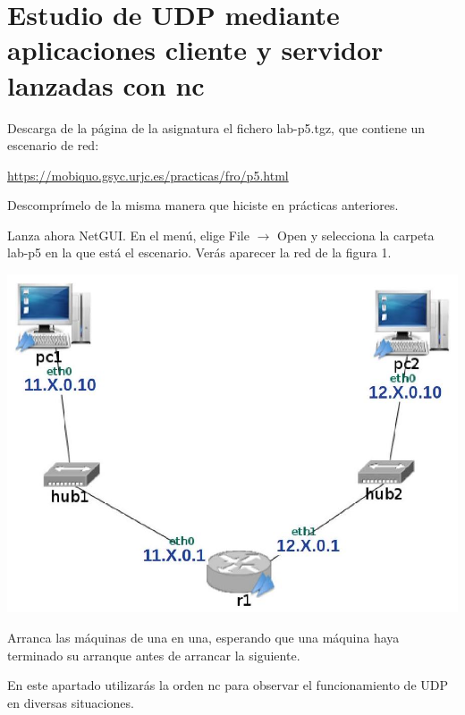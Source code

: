 \documentclass[12pt, a4paper]{report}
\begin{document}
\section{Estudio de UDP mediante aplicaciones cliente y servidor lanzadas con nc}
Descarga de la página de la asignatura el fichero lab-p5.tgz, que contiene un escenario de red:

\href{https://mobiquo.gsyc.urjc.es/practicas/fro/p5.html}{https://mobiquo.gsyc.urjc.es/practicas/fro/p5.html}

Descomprímelo de la misma manera que hiciste en prácticas anteriores.

Lanza ahora NetGUI. En el menú, elige File $\rightarrow$ Open y selecciona la carpeta lab-p5 en la que está el escenario. Verás aparecer la red de la figura 1.

\begin{center}
	\includegraphics[max width=\textwidth]{enunciado1}
\end{center}

Arranca las máquinas de una en una, esperando que una máquina haya terminado su arranque antes de arrancar la siguiente.

En este apartado utilizarás la orden nc para observar el funcionamiento de UDP en diversas situaciones.
\end{document}
